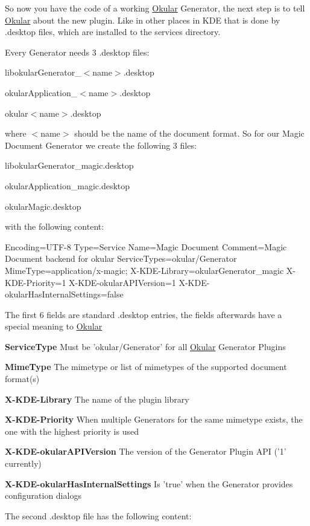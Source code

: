 So now you have the code of a working \hyperlink{namespaceOkular}{Okular} Generator, the next step is to tell \hyperlink{namespaceOkular}{Okular} about the new plugin. Like in other places in K\+D\+E that is done by .desktop files, which are installed to the services directory.

Every Generator needs 3 .desktop files\+:

\begin{DoxyItemize}
\item libokular\+Generator\+\_\+$<$name$>$.desktop \item okular\+Application\+\_\+$<$name$>$.desktop \item okular$<$name$>$.desktop\end{DoxyItemize}
where $<$name$>$ should be the name of the document format. So for our Magic Document Generator we create the following 3 files\+:

\begin{DoxyItemize}
\item libokular\+Generator\+\_\+magic.\+desktop \item okular\+Application\+\_\+magic.\+desktop \item okular\+Magic.\+desktop\end{DoxyItemize}
with the following content\+:

\begin{DoxyVerb}
Encoding=UTF-8
Type=Service
Name=Magic Document
Comment=Magic Document backend for okular
ServiceTypes=okular/Generator
MimeType=application/x-magic;
X-KDE-Library=okularGenerator_magic
X-KDE-Priority=1
X-KDE-okularAPIVersion=1
X-KDE-okularHasInternalSettings=false
\end{DoxyVerb}


The first 6 fields are standard .desktop entries, the fields afterwards have a special meaning to \hyperlink{namespaceOkular}{Okular}

\begin{DoxyItemize}
\item {\bfseries Service\+Type} Must be 'okular/\+Generator' for all \hyperlink{namespaceOkular}{Okular} Generator Plugins \item {\bfseries Mime\+Type} The mimetype or list of mimetypes of the supported document format(s) \item {\bfseries X-\/\+K\+D\+E-\/\+Library} The name of the plugin library \item {\bfseries X-\/\+K\+D\+E-\/\+Priority} When multiple Generators for the same mimetype exists, the one with the highest priority is used \item {\bfseries X-\/\+K\+D\+E-\/okular\+A\+P\+I\+Version} The version of the Generator Plugin A\+P\+I ('1' currently) \item {\bfseries X-\/\+K\+D\+E-\/okular\+Has\+Internal\+Settings} Is 'true' when the Generator provides configuration dialogs\end{DoxyItemize}
The second .desktop file has the following content\+:

